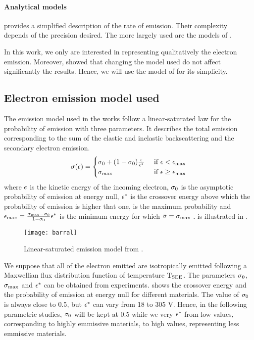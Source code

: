 \paragraph{Analytical models} provides a simplified description of the rate of emission.
Their complexity depends of the precision desired.
The more largely used are the models of \citet{vaughan1989,barral2003a,sydorenko2006b}.

In this work, we only are interested in representing qualitatively the electron emission.
Moreover, \citet{croes2017} showed that changing the model used do not affect significantly the results. 
Hence, we will use the model of \citet{barral2003a} for its simplicity.

\subsection{Electron emission model used}
\label{sec-modelused}
The emission model used in the works follow a linear-saturated law for the probability of emission with three parameters. 
It describes the total emission corresponding to the sum of the elastic and inelastic backscattering and the secondary electron emission.
\begin{equation} \label{eq-proba_barral}
  \sigma (\epsilon) = 
  \begin{cases}
    \sigma _0 + (1 - \sigma _0) \frac{\epsilon}{\epsilon^{*}}   &\text{ if } \epsilon <  \epsilon_{\max} \\
    \sigma _{\rm max}  &\text{ if } \epsilon \geq \epsilon_{\max}
  \end{cases}
\end{equation}
where $\epsilon$ is the kinetic energy of the incoming electron, $\sigma _0$ is the asymptotic probability of emission at energy null, $\epsilon^{*}$ is the crossover energy above which the probability of emission is higher that one, \probamax is the maximum probability and $\epsilon_{\max}= \frac{\sigma _{\rm max}  - \sigma _0}{1 - \sigma _0} \epsilon^{*} $ is the minimum energy for which $ \bar{\sigma } = \sigma _{\rm max} $ .
 is illustrated in .

\begin{figure}[hbtp]
  \centering
  \texttt{[image: barral]}
  \caption{Linear-saturated emission model from \citet{barral2003a}.}
  \label{fig-modelbarral}
\end{figure}

 We suppose that all of the electron emitted are isotropically emitted following a Maxwellian flux distribution function of temperature $\mathrm{T_{SEE}}$.
 The parameters $\sigma _0$,  $\sigma _{\rm max} $ and $\epsilon^{*}$ can be obtained from experiments. 
  shows the crossover energy and the  probability of emission at energy null for different materials.
 The value of $\sigma _0$ is always close to $0.5$, but $\epsilon^{*}$ can vary from 18 to 305 V.
 Hence, in the following parametric studies, $\sigma _0$ will be kept at 0.5 while we very $\epsilon^{*}$ from low values, corresponding to highly emmissive materials, to high values, representing less emmissive materials.
 
